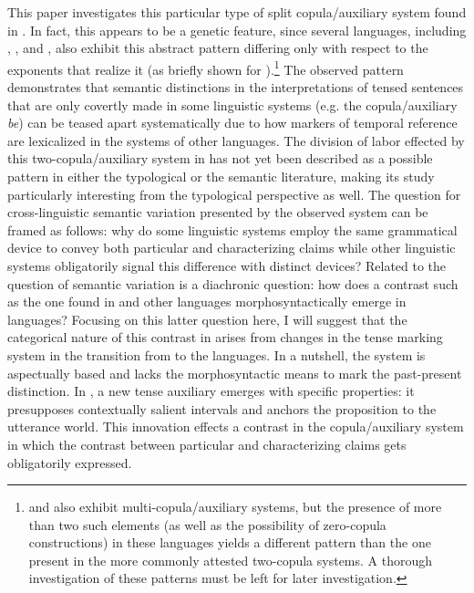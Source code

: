 \documentclass[output=paper,hidelinks]{langscibook}
\begin{document}
This paper investigates this particular type of split copula/auxiliary system found in . In fact, this appears to be a genetic feature, since several  languages, including , , and , also exhibit this abstract pattern differing only with respect to the exponents that realize it (as briefly shown for ).\footnote{ and  \citep{mahapatra2009} also exhibit multi-copula/auxiliary systems, but the presence of more than two such elements (as well as the possibility of zero-copula constructions) in these languages yields a different pattern than the one present in the more commonly attested two-copula systems. A thorough investigation of these patterns must be left for later investigation.} The observed pattern demonstrates that semantic distinctions in the interpretations of tensed sentences that are only covertly made in some linguistic systems (e.g. the  copula/auxiliary \emph{be}) can be teased apart systematically due to how markers of temporal reference are lexicalized in the systems of other languages. The division of labor effected by this two-copula/auxiliary system in  has not yet been described as a possible pattern in either the typological or the semantic literature, making its study particularly interesting from the typological perspective as well. The question for cross-linguistic semantic variation presented by the observed system can be framed as follows: why do some linguistic systems employ the same grammatical device to convey both particular and characterizing claims while other linguistic systems obligatorily signal this difference with distinct devices? Related to the question of semantic variation is a diachronic question: how does a contrast such as the one found in  and other  languages morphosyntactically emerge in languages? Focusing on this latter question here, I will suggest that the categorical nature of this contrast in  arises from changes in the tense marking system in the transition from  to the  languages. In a nutshell, the  system is aspectually based and lacks the morphosyntactic means to mark the past-present distinction. In , a new tense auxiliary emerges with specific properties: it presupposes contextually salient intervals and anchors the proposition to the utterance world. This innovation effects a contrast in the copula/auxiliary system in which the contrast between particular and characterizing claims gets obligatorily expressed.
\end{document}
